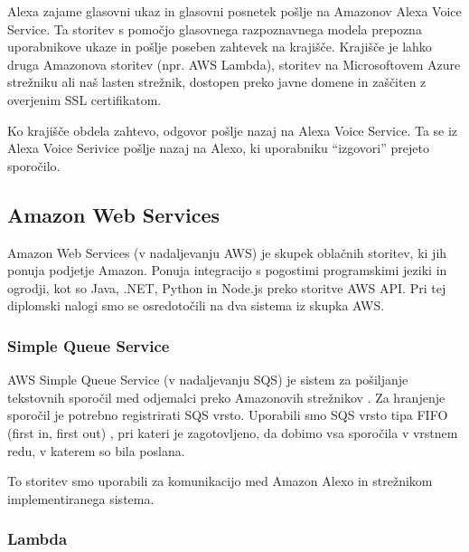 \documentclass[a4paper, 12pt]{book}
\begin{document}
Alexa zajame glasovni ukaz in glasovni posnetek pošlje na Amazonov Alexa Voice Service.
Ta storitev s pomočjo glasovnega razpoznavnega modela prepozna uporabnikove ukaze in pošlje poseben zahtevek na krajišče.
Krajišče je lahko druga Amazonova storitev (npr. AWS Lambda), storitev na Microsoftovem Azure strežniku ali naš lasten strežnik, dostopen preko javne domene in zaščiten z overjenim SSL certifikatom.

Ko krajišče obdela zahtevo, odgovor pošlje nazaj na Alexa Voice Service.
Ta se iz Alexa Voice Serivice pošlje nazaj na Alexo, ki uporabniku \enquote{izgovori} prejeto sporočilo.

\subsection{Amazon Web Services}

Amazon Web Services (v nadaljevanju AWS) je skupek oblačnih storitev, ki jih ponuja podjetje Amazon.
Ponuja integracijo s pogostimi programskimi jeziki in ogrodji, kot so Java, .NET, Python in Node.js preko storitve AWS API.
Pri tej diplomski nalogi smo se osredotočili na dva sistema iz skupka AWS.

\subsubsection{Simple Queue Service}

AWS Simple Queue Service (v nadaljevanju SQS) je sistem za pošiljanje tekstovnih sporočil med odjemalci preko Amazonovih strežnikov \cite{sqs}.
Za hranjenje sporočil je potrebno registrirati SQS vrsto. 
Uporabili smo SQS vrsto tipa FIFO (first in, first out) \cite{sqsfifo}, pri kateri je zagotovljeno, da dobimo vsa sporočila v vrstnem redu, v katerem so bila poslana.

To storitev smo uporabili za komunikacijo med Amazon Alexo in strežnikom implementiranega sistema.

\subsubsection{Lambda}
\end{document}
